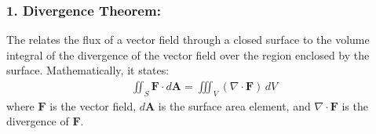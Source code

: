 \documentclass[letterpaper,10pt,english]{jupyterBook}
\begin{document}
\subsubsection{1. Divergence Theorem:}
\label{\detokenize{prerequisites:divergence-theorem}}
\sphinxAtStartPar
The  relates the flux of a vector field through a closed surface to the volume integral of the divergence of the vector field over the region enclosed by the surface. Mathematically, it states:
\begin{equation*}
\begin{split}
\iint_S \mathbf{F} \cdot d\mathbf{A} = \iiint_V (\nabla \cdot \mathbf{F}) \, dV
\end{split}
\end{equation*}
\sphinxAtStartPar
where \( \mathbf{F} \) is the vector field, \( d\mathbf{A} \) is the surface area element, and \( \nabla \cdot \mathbf{F} \) is the divergence of \( \mathbf{F} \).
\end{document}
